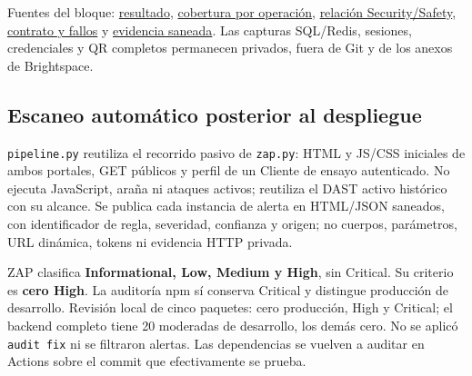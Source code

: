 Fuentes del bloque:
\href{https://github.com/Emperador24/HEXACORE/blob/9bc1ee5/App/infra/informe-atributos/seguridad/RESULTADO.md}{resultado},
\href{https://github.com/Emperador24/HEXACORE/blob/9bc1ee5/App/infra/informe-atributos/seguridad/COBERTURA-RECURSOS.md}{cobertura por operación},
\href{https://github.com/Emperador24/HEXACORE/blob/main/App/infra/informe-atributos/seguridad/SECURITY-SAFETY.md}{relación Security/Safety},
\href{https://github.com/Emperador24/HEXACORE/blob/9bc1ee5/App/infra/informe-atributos/seguridad/AUTORIZACION-CIERRE.md}{contrato y fallos}
y \href{https://github.com/Emperador24/HEXACORE/blob/9bc1ee5/App/infra/informe-atributos/seguridad/CIERRE-EVIDENCIA.json}{evidencia saneada}.
Las capturas SQL/Redis, sesiones, credenciales y QR completos permanecen privados,
fuera de Git y de los anexos de Brightspace.

\subsection{Escaneo automático posterior al despliegue}
\texttt{pipeline.py} reutiliza el recorrido pasivo de \texttt{zap.py}: HTML y
JS/CSS iniciales de ambos portales, GET públicos y perfil de un Cliente de ensayo
autenticado. No ejecuta JavaScript, araña ni ataques activos; reutiliza el DAST
activo histórico con su alcance. Se publica cada instancia de alerta en HTML/JSON
saneados, con identificador de regla, severidad, confianza y origen; no cuerpos,
parámetros, URL dinámica, tokens ni evidencia HTTP privada.

ZAP clasifica \textbf{Informational, Low, Medium y High}, sin Critical. Su criterio
es \textbf{cero High}. La auditoría npm sí conserva Critical y distingue producción
de desarrollo. Revisión local de cinco paquetes: cero producción, High y Critical;
el backend completo tiene 20 moderadas de desarrollo, los demás cero. No se
aplicó \texttt{audit fix} ni se filtraron alertas. Las dependencias se vuelven a
auditar en Actions sobre el commit que efectivamente se prueba.

